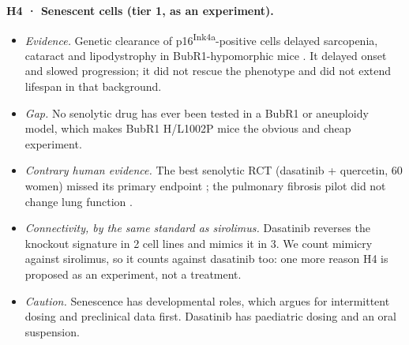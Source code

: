\documentclass[10pt]{article}
\begin{document}
\textbf{H4 · Senescent cells (tier 1, as an experiment).}
\begin{itemize}
\item \textit{Evidence.} Genetic clearance of p16\textsuperscript{Ink4a}-positive cells delayed sarcopenia, cataract
  and lipodystrophy in BubR1-hypomorphic mice \citep{baker11}. It delayed onset and slowed progression; it did not
  rescue the phenotype and did not extend lifespan in that background.
\item \textit{Gap.} No senolytic drug has ever been tested in a BubR1 or aneuploidy model, which makes BubR1 H/L1002P
  mice \citep{sieben} the obvious and cheap experiment.
\item \textit{Contrary human evidence.} The best senolytic RCT (dasatinib + quercetin, 60 women) missed its primary
  endpoint \citep{farr}; the pulmonary fibrosis pilot did not change lung function \citep{justice}.
\item \textit{Connectivity, by the same standard as sirolimus.} Dasatinib reverses the knockout signature in 2 cell
  lines and mimics it in 3. We count mimicry against sirolimus, so it counts against dasatinib too: one more reason
  H4 is proposed as an experiment, not a treatment.
\item \textit{Caution.} Senescence has developmental roles, which argues for intermittent dosing and preclinical data
  first. Dasatinib has paediatric dosing and an oral suspension.
\end{itemize}
\end{document}
